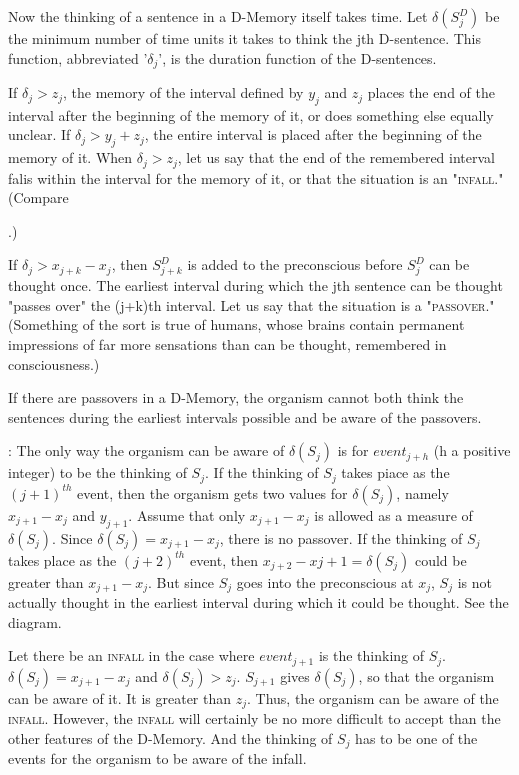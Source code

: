 \documentclass[10pt,twoside,draft]{memoir}
\newcommand{\speech}[1]{
	\textquote{\emph{#1}}}
\newcommand{\said}[1]{ %
	\speech{#1}}
\newcommand{\greater}{>}
\begin{document}
{{Now the thinking of a sentence in a D-Memory itself takes time. Let 
$\delta(S^D_j)$ be the minimum number of time units it takes to think the jth 
D-sentence. This function, abbreviated '$\delta_j$', is the duration function of the 
D-sentences. 

 If $\delta_j\greater z_j$, the memory of the interval defined by $y_j$ and 
$z_j$ places the end of the interval after the beginning of the memory of it, or 
does something else equally unclear. If $\delta_j\greater y_j+z_j$, the entire interval is placed 
after the beginning of the memory of it. When $\delta_j\greater z_j$, let us say that the end 
of the remembered interval falis within the interval for the memory of it, or 
that the situation is an "\textsc{infall}." (Compare \said{The light went out a half-second 
ago}.)

 If $\delta_j\greater x_{j+k}-x_j$, then $S^D_{j+k}$ is added to the preconscious 
before $S^D_j$ can be thought once. The earliest interval during which the jth 
sentence can be thought "passes over" the (j+k)th interval. Let us say that 
the situation is a "\textsc{passover}." (Something of the sort is true of humans, 
whose brains contain permanent impressions of far more sensations than can 
be thought, remembered in consciousness.) 

 If there are passovers in a D-Memory, the organism 
cannot both think the sentences during the earliest intervals possible and be 
aware of the passovers. 

\proof: The only way the organism can be aware of $\delta(S_j)$
is for $event_{j+h}$ (h a positive integer) to be the thinking of $S_j$. 
If the thinking of $S_j$ takes piace as the $(j+1)^{th}$ event, then the organism gets two 
values for $\delta(S_j)$, namely $x_{j+1}-x_j$ and $y_{j+1}$. Assume that only $x_{j+1}-x_j$
is allowed as a measure of $\delta(S_j)$. Since $\delta(S_j)=x_{j+1}-x_j$, there is no passover. If 
the thinking of $S_j$ takes place as the $(j+2)^{th}$ event, then $x_{j+2}-x{j+1}=\delta(S_j)$
could be greater than $x_{j+1}-x_j$. But since $S_j$ goes into the preconscious at $x_j$, 
$S_j$ is not actually thought in the earliest interval during which it could be 
thought. See the diagram. 


 Let there be an \textsc{infall} in the case where $event_{j+1}$ is the 
thinking of $S_j$. $\delta(S_j)=x_{j+1}-x_j$ and $\delta(S_j)\greater z_j$. $S_{j+1}$ gives $\delta(S_j)$, 
so that the organism can be aware of it. 
It is greater than $z_j$. Thus, the organism can be 
aware of the \textsc{infall}. However, the \textsc{infall} will certainly be no more difficult to 
accept than the other features of the D-Memory. And the thinking of $S_j$ has 
to be one of the events for the organism to be aware of the infall. 

}}
\end{document}
